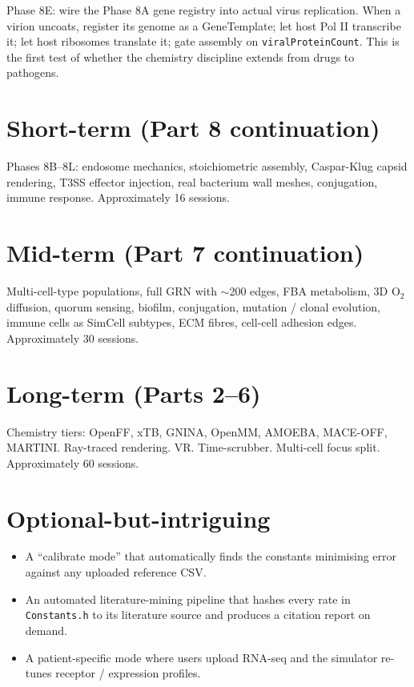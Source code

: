 \documentclass[11pt,letterpaper,twoside,openany]{book}
\newcommand{\code}[1]{\texttt{#1}}
\newcommand{\file}[1]{\texttt{\small#1}}
\begin{document}
Phase 8E: wire the Phase 8A gene registry into actual virus
replication. When a virion uncoats, register its genome as a
GeneTemplate; let host Pol II transcribe it; let host ribosomes
translate it; gate assembly on \code{viralProteinCount}. This is
the first test of whether the chemistry discipline extends from
drugs to pathogens.

\section{Short-term (Part 8 continuation)}

Phases 8B--8L: endosome mechanics, stoichiometric assembly,
Caspar-Klug capsid rendering, T3SS effector injection, real
bacterium wall meshes, conjugation, immune response.
Approximately 16 sessions.

\section{Mid-term (Part 7 continuation)}

Multi-cell-type populations, full GRN with $\sim$200 edges, FBA
metabolism, 3D O$_2$ diffusion, quorum sensing, biofilm,
conjugation, mutation / clonal evolution, immune cells as SimCell
subtypes, ECM fibres, cell-cell adhesion edges. Approximately 30
sessions.

\section{Long-term (Parts 2--6)}

Chemistry tiers: OpenFF, xTB, GNINA, OpenMM, AMOEBA, MACE-OFF,
MARTINI. Ray-traced rendering. VR. Time-scrubber. Multi-cell
focus split. Approximately 60 sessions.

\section{Optional-but-intriguing}

\begin{itemize}
  \item A ``calibrate mode'' that automatically finds the
        constants minimising error against any uploaded reference
        CSV.
  \item An automated literature-mining pipeline that hashes every
        rate in \file{Constants.h} to its literature source and
        produces a citation report on demand.
  \item A patient-specific mode where users upload RNA-seq and
        the simulator re-tunes receptor / expression profiles.
\end{itemize}
\end{document}
